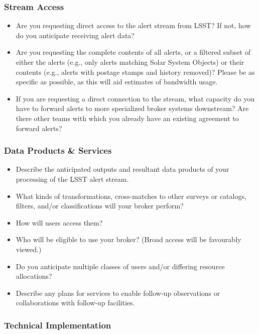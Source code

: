 \documentclass[DM,toc,lsstdraft]{lsstdoc}
\begin{document}
\subsubsection{Stream Access}

\begin{itemize}
\item Are you requesting direct access to the alert stream from LSST?  If not, how do you anticipate receiving alert data? 
\item Are you requesting the complete contents of all alerts, or a filtered subset of either the alerts (e.g., only alerts matching Solar System Objects) or their contents (e.g., alerts with postage stamps and history removed)?  Please be as specific as possible, as this will aid estimates of bandwidth usage.
\item If you are requesting a direct connection to the stream, what capacity do you have to forward alerts to more specialized broker systems downstream?  Are there other teams with which you already have an existing agreement to forward alerts?
\end{itemize}

\subsubsection{Data Products \& Services}

\begin{itemize}
\item Describe the anticipated outputs and resultant data products of your processing of the LSST alert stream. 
\item What kinds of transformations, cross-matches to other surveys or catalogs, filters, and/or classifications will your broker perform?
\item How will users access them?
\item Who will be eligible to use your broker?  (Broad access will be favourably viewed.)
\item Do you anticipate multiple classes of users and/or differing resource allocations?
\item Describe any plans for services to enable follow-up observations or collaborations with follow-up facilities.
\end{itemize}



\subsubsection{Technical Implementation}
\end{document}
